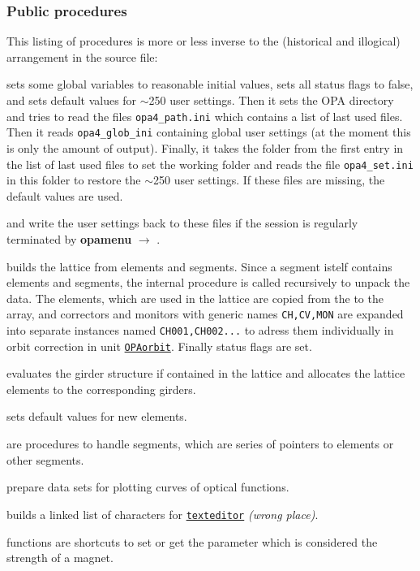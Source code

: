 \documentclass[12pt]{article}
\newcommand\code[1]{{\tt #1}}
\newcommand{\ofld}[1]{\colorbox{black!15}{{\bf #1}}}
\newcommand\guico[1]{{\color{blue}\code{#1}}}
\newcommand{\unico}[1]{{\color{burntorange}\code{#1}}}
\newcommand{\evcod}[2]{\ofld{#1} $\rightarrow$ \guico{#2}}
\newcommand{\opagui}[1]{\colorbox{blue!20}{\code{#1}}}
\newcommand{\ogui}[1]{\hyperref[#1]{\opagui{#1}}}
\newcommand{\ppro}[1]{\subsubsection*{Public procedures} #1}
\newcommand{\todo}[1]{{\color{red}\em #1}}
\begin{document}
\ppro{
This listing of procedures is more or less inverse to the (historical and illogical) arrangement in the source file:

\unico{Initialization} sets some global variables to reasonable initial values, sets all status flags to false, and sets default values for $\sim$250 user settings.
Then it sets the OPA directory and tries to read the files \code{opa4\_path.ini} which contains a list of last used files. Then it reads \code{opa4\_glob\_ini} containing global user settings (at the moment this is only the amount of output). Finally, it takes the folder from the first entry in the list of last used files to set the working folder and reads the file \code{opa4\_set.ini} in this folder to restore the $\sim$250 user settings. If these files are missing, the default values are used.

\unico{GlobDefWriteFile} and \unico{DefWriteFile} write the user settings back to these files if the session is regularly terminated by \evcod{opamenu}{ExitOPA}.

\unico{MakeLattice} builds the lattice from elements and segments. Since a segment istelf contains elements and segments, the internal procedure \unico{SegLat} is called recursively to unpack the data. 
The elements, which are used in the lattice are copied from the \unico{Elem} to the \unico{Ella} array, and correctors and monitors with generic names \code{CH,CV,MON}
are expanded into separate instances named \code{CH001,CH002...} to adress them individually in orbit correction in unit \ogui{OPAorbit}. Finally status flags are set.

\unico{GirderSetup} evaluates the girder structure if contained in the lattice and allocates the lattice elements to the corresponding girders.

\unico{IniElem} sets default values for new elements.

\unico{AppendAE, ClearSeg, NAESeg} are procedures to handle segments, which are series of pointers to elements or other segments.

\unico{AppendCurve, ClearCurve}  prepare data sets for plotting curves of optical functions. 

\unico{AppendChar} builds a linked list of characters for \ogui{texteditor} \todo{(wrong place)}.

\unico{putkval, getkval, putSexkval, getSexkval} functions are shortcuts to set or get the parameter which is considered the strength of a magnet.

}
\end{document}
